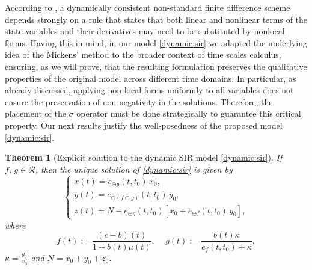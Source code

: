 \documentclass[pdflatex,sn-mathphys-num]{sn-jnl}
\newtheorem{theorem}{Theorem}
\theoremstyle{remark}
\begin{document}
According to \cite{Mickens05}, a dynamically consistent non-standard finite 
difference scheme depends strongly on a rule that states that both linear 
and nonlinear terms of the state variables and their derivatives 
may need to be substituted by nonlocal forms. 
Having this in mind, in our model \eqref{dynamic:sir}
we adapted the underlying idea of the Mickens' method to the broader 
context of time scales calculus, ensuring, as we will prove, 
that the resulting formulation preserves the
qualitative properties of the original model across different time domains. 
In particular, as already discussed, 
applying non-local forms uniformly to all variables 
does not ensure the preservation of non-negativity 
in the solutions. Therefore, the placement of the $\sigma$ operator must be done 
strategically to guarantee this critical property. Our next results
justify the well-posedness of the proposed model \eqref{dynamic:sir}.

\begin{theorem}[Explicit solution to the dynamic SIR model \eqref{dynamic:sir}]
\label{thm:6}
If $f,\, g \in \mathcal{R}$, then the unique solution of 
\eqref{dynamic:sir} is given by
\begin{equation}
\label{dynamic:solution}
\begin{cases}
x(t) = e_{\ominus g} (t,t_0)\,x_0,\\
y(t) = e_{\ominus \left(f \oplus g\right)}(t,t_0)\,y_0,\\
z(t) = N - e_{\ominus g}(t,t_0)\left[x_0 + e_{\ominus f}(t,t_0)\,y_0\right],
\end{cases}
\end{equation}
where 
\begin{equation}
\label{eq:f:g}
f(t):= \frac{(c-b)(t)}{1 + b(t)\mu(t)},\,\quad g(t) 
:= \frac{b(t)\kappa}{e_f(t,t_0) + \kappa},
\end{equation}
$\kappa = \frac{y_0}{x_0}$ and $N = x_0 + y_0 + z_0$.
\end{theorem}
\end{document}
